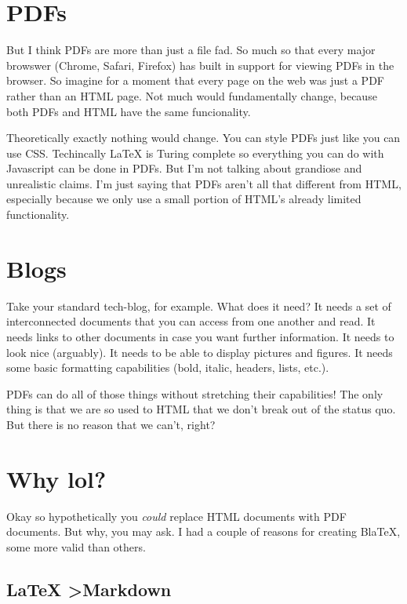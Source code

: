 \documentclass[12pt]{article}
\begin{document}
  \section{PDFs}

  But I think PDFs are more than just a file fad. So much so that every major browswer (Chrome, Safari, Firefox) has built in support for viewing PDFs in the browser. So imagine for a moment that every page on the web was just a PDF rather than an HTML page. Not much would fundamentally change, because both PDFs and HTML have the same funcionality. 

  Theoretically exactly nothing would change. You can style PDFs just like you can use CSS. Techincally LaTeX is Turing complete so everything you can do with Javascript can be done in PDFs. But I'm not talking about grandiose and unrealistic claims. I'm just saying that PDFs aren't all that different from HTML, especially because we only use a small portion of HTML's already limited functionality. 

  \section{Blogs}

  Take your standard tech-blog, for example. What does it need? It needs a set of interconnected documents that you can access from one another and read. It needs links to other documents in case you want further information. It needs to look nice (arguably). It needs to be able to display pictures and figures. It needs some basic formatting capabilities (bold, italic, headers, lists, etc.). 

  PDFs can do all of those things without stretching their capabilities! The only thing is that we are so used to HTML that we don't break out of the status quo. But there is no reason that we can't, right? 

  \section{Why lol?}

  Okay so hypothetically you \textit{could} replace HTML documents with PDF documents. But why, you may ask. I had a couple of reasons for creating BlaTeX, some more valid than others. 

  \subsection{LaTeX \textgreater  Markdown}
\end{document}

